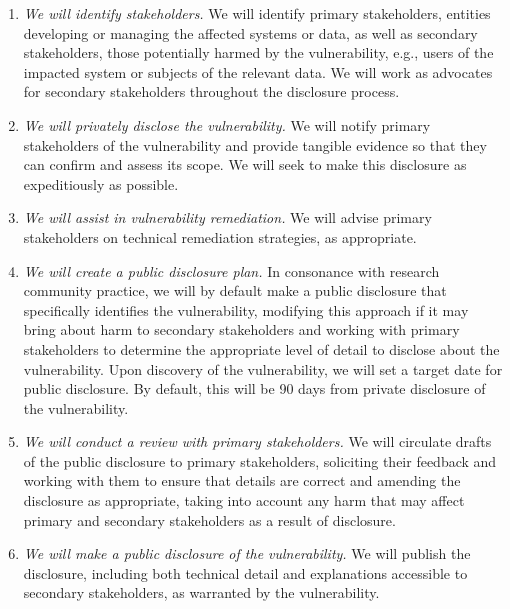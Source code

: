 \begin{enumerate}
\item {\em We will identify stakeholders.} We will identify primary stakeholders, entities developing or managing the affected systems or data, as well as secondary stakeholders, those potentially harmed by the vulnerability, e.g., users of the impacted system or subjects of the relevant data. We will work as advocates for secondary stakeholders throughout the disclosure process.

\item {\em We will privately disclose the vulnerability.} We will notify primary stakeholders of the vulnerability and provide tangible evidence so that they can confirm and assess its scope. We will seek to make this disclosure as expeditiously as possible.
\item {\em We will assist in vulnerability remediation.} We will advise primary stakeholders on technical remediation strategies, as appropriate.
\item {\em We will create a public disclosure plan.} In consonance with research community practice, we will by default make a public disclosure that specifically identifies the vulnerability, modifying this approach if it may bring about harm to secondary stakeholders and working with primary stakeholders to determine the appropriate level of detail to disclose about the vulnerability. Upon discovery of the vulnerability, we will set a target date for public disclosure. By default, this will be 90 days from private disclosure of the vulnerability.
\item {\em We will conduct a review with primary stakeholders.} We will circulate drafts of the public disclosure to primary stakeholders, soliciting their feedback and working with them to ensure that details are correct and amending the disclosure as appropriate, taking into account any harm that may affect primary and
secondary stakeholders as a result of disclosure.
\item {\em We will make a public disclosure of the vulnerability.} We will publish the disclosure, including both technical detail and explanations accessible to secondary stakeholders, as warranted by the vulnerability.
\end{enumerate}






